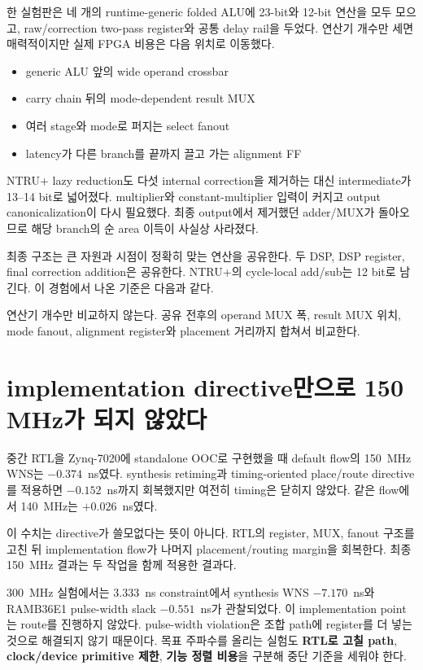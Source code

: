 한 실험판은 네 개의 runtime-generic folded ALU에 23-bit와 12-bit 연산을 모두
모으고, raw/correction two-pass register와 공통 delay rail을 두었다. 연산기
개수만 세면 매력적이지만 실제 FPGA 비용은 다음 위치로 이동했다.

\begin{itemize}
  \item generic ALU 앞의 wide operand crossbar
  \item carry chain 뒤의 mode-dependent result MUX
  \item 여러 stage와 mode로 퍼지는 select fanout
  \item latency가 다른 branch를 끝까지 끌고 가는 alignment FF
\end{itemize}

NTRU+ lazy reduction도 다섯 internal correction을 제거하는 대신 intermediate가
13--14 bit로 넓어졌다. multiplier와 constant-multiplier 입력이 커지고 output
canonicalization이 다시 필요했다. 최종 output에서 제거했던 adder/MUX가
돌아오므로 해당 branch의 순 area 이득이 사실상 사라졌다.

최종 구조는 큰 자원과 시점이 정확히 맞는 연산을 공유한다. 두 DSP, DSP
register, final correction addition은 공유한다. NTRU+의 cycle-local add/sub는
12 bit로 남긴다. 이 경험에서 나온 기준은 다음과 같다.

\begin{tradeoffbox}
연산기 개수만 비교하지 않는다. 공유 전후의 operand MUX 폭, result MUX 위치,
mode fanout, alignment register와 placement 거리까지 합쳐서 비교한다.
\end{tradeoffbox}

\section{implementation directive만으로 150 MHz가 되지 않았다}

중간 RTL을 Zynq-7020에 standalone OOC로 구현했을 때 default flow의
150~MHz WNS는 $-0.374$~ns였다. synthesis retiming과 timing-oriented
place/route directive를 적용하면 $-0.152$~ns까지 회복했지만 여전히
timing은 닫히지 않았다. 같은 flow에서 140~MHz는 $+0.026$~ns였다.

이 수치는 directive가 쓸모없다는 뜻이 아니다. RTL의 register, MUX, fanout
구조를 고친 뒤 implementation flow가 나머지 placement/routing margin을
회복한다. 최종 150~MHz 결과는 두 작업을 함께 적용한 결과다.

300~MHz 실험에서는 3.333~ns constraint에서 synthesis WNS $-7.170$~ns와
RAMB36E1 pulse-width slack $-0.551$~ns가 관찰되었다. 이 implementation
point는 route를 진행하지 않았다. pulse-width violation은 조합 path에 register를
더 넣는 것으로 해결되지 않기 때문이다. 목표 주파수를 올리는 실험도
\textbf{RTL로 고칠 path}, \textbf{clock/device primitive 제한},
\textbf{기능 정렬 비용}을 구분해 중단 기준을 세워야 한다.

